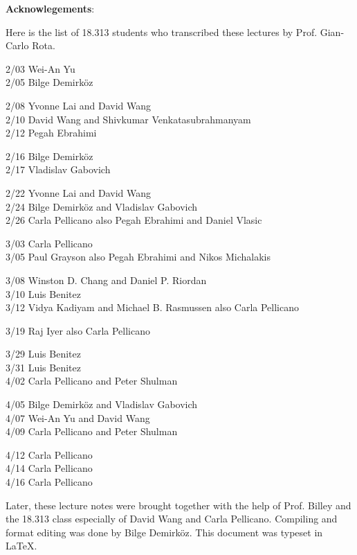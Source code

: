 

{\bf Acknowlegements}:

Here is the list of 18.313 students who transcribed these lectures by
Prof. Gian-Carlo Rota. 

2/03  Wei-An Yu\\
2/05  Bilge Demirk\"oz

2/08  Yvonne Lai and David Wang\\
2/10  David Wang and Shivkumar Venkatasubrahmanyam\\
2/12  Pegah Ebrahimi

2/16  Bilge Demirk\"oz \\
2/17  Vladislav Gabovich 

2/22  Yvonne Lai and David Wang \\
2/24  Bilge Demirk\"oz and Vladislav Gabovich \\
2/26  Carla Pellicano also Pegah Ebrahimi and Daniel Vlasic 

3/03  Carla Pellicano \\
3/05  Paul Grayson also Pegah Ebrahimi and Nikos Michalakis 

3/08  Winston D. Chang and Daniel P. Riordan \\
3/10  Luis Benitez \\
3/12  Vidya Kadiyam and Michael B. Rasmussen also Carla Pellicano

3/19  Raj Iyer also Carla Pellicano

3/29  Luis Benitez \\
3/31  Luis Benitez \\
4/02  Carla Pellicano and  Peter Shulman

4/05  Bilge Demirk\"oz and Vladislav Gabovich \\ 
4/07  Wei-An Yu and David Wang \\
4/09  Carla Pellicano and Peter Shulman

4/12 Carla Pellicano \\
4/14 Carla Pellicano \\
4/16 Carla Pellicano

Later, these lecture notes were brought together with the help of
Prof. Billey and the 18.313 class especially of David Wang and Carla
Pellicano.  Compiling and format editing was done by Bilge
Demirk\"oz. This document was typeset in \LaTeX.



